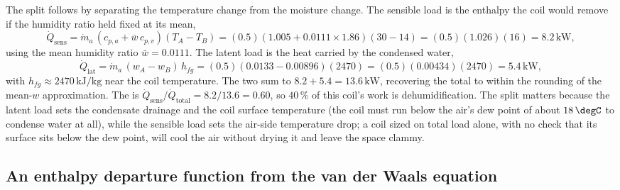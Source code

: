 The split follows by separating the temperature change from the moisture
change. The sensible load is the enthalpy the coil would remove if the
humidity ratio held fixed at its mean,
\[
\dot{Q}_{\text{sens}} = \dot{m}_a\,(c_{p,a} + \bar{w}\,c_{p,v})(T_A - T_B) =
(0.5)(1.005 + 0.0111\times 1.86)(30 - 14) = (0.5)(1.026)(16) =
8.2\,\text{kW},
\]
using the mean humidity ratio $\bar{w} = 0.0111$. The latent load is the
heat carried by the condensed water,
\[
\dot{Q}_{\text{lat}} = \dot{m}_a\,(w_A - w_B)\,h_{fg} = (0.5)(0.0133 -
0.00896)(2470) = (0.5)(0.00434)(2470) = 5.4\,\text{kW},
\]
with $h_{fg} \approx 2470\,\text{kJ}/\text{kg}$ near the coil temperature.
The two sum to $8.2 + 5.4 = 13.6\,\text{kW}$, recovering the total to within
the rounding of the mean-$w$ approximation. The  is $\dot{Q}_{\text{sens}}/\dot{Q}_{\text{total}} = 8.2/13.6 = 0.60$,
so $40\,\%$ of this coil's work is dehumidification. The split matters
because the latent load sets the condensate drainage and the coil surface
temperature (the coil must run below the air's dew point of about $18\,\degC$
to condense water at all), while the sensible load sets the air-side
temperature drop; a coil sized on total load alone, with no check that its
surface sits below the dew point, will cool the air without drying it and
leave the space clammy.



\subsection{An enthalpy departure function from the van der Waals equation}

